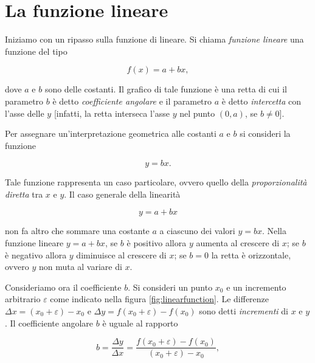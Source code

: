\documentclass[
  11pt,
]{krantz}
\theoremstyle{definition}
\theoremstyle{definition}
\theoremstyle{definition}
\theoremstyle{definition}
\theoremstyle{remark}
\begin{document}
\hypertarget{la-funzione-lineare}{%
\section{La funzione lineare}\label{la-funzione-lineare}}

Iniziamo con un ripasso sulla funzione di lineare. Si chiama \emph{funzione lineare} una funzione del tipo

\begin{equation}
f(x) = a + b x,
\end{equation}

dove \(a\) e \(b\) sono delle costanti. Il grafico di tale funzione è una retta di cui il parametro \(b\) è detto \emph{coefficiente angolare} e il parametro \(a\) è detto \emph{intercetta} con l'asse delle \(y\) {[}infatti, la retta interseca l'asse \(y\) nel punto \((0,a)\), se \(b \neq 0\){]}.

Per assegnare un'interpretazione geometrica alle costanti \(a\) e \(b\) si consideri la funzione

\begin{equation}
y = b x.
\end{equation}

Tale funzione rappresenta un caso particolare, ovvero quello della \emph{proporzionalità diretta} tra \(x\) e \(y\). Il caso generale della linearità

\begin{equation}
y = a + b x
\end{equation}

non fa altro che sommare una costante \(a\) a ciascuno dei valori \(y = b x\). Nella funzione lineare \(y = a + b x\), se \(b\) è positivo allora \(y\) aumenta al crescere di \(x\); se \(b\) è negativo allora \(y\) diminuisce al crescere di \(x\); se \(b=0\) la retta è orizzontale, ovvero \(y\) non muta al variare di \(x\).

Consideriamo ora il coefficiente \(b\). Si consideri un punto \(x_0\) e un incremento arbitrario \(\varepsilon\) come indicato nella figura \ref{fig:linearfunction}. Le differenze \(\Delta x = (x_0 + \varepsilon) - x_0\) e \(\Delta y = f(x_0 + \varepsilon) - f(x_0)\) sono detti \emph{incrementi} di \(x\) e \(y\). Il coefficiente angolare \(b\) è uguale al rapporto

\begin{equation}
    b = \frac{\Delta y}{\Delta x} = \frac{f(x_0 + \varepsilon) - f(x_0)}{(x_0 + \varepsilon) - x_0},
\end{equation}
\end{document}
